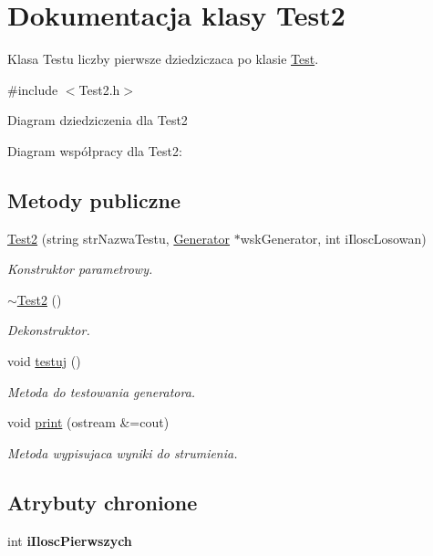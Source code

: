 \hypertarget{classTest2}{\section{Dokumentacja klasy Test2}
\label{classTest2}
}


Klasa Testu liczby pierwsze dziedziczaca po klasie \hyperlink{classTest}{Test}.  




{\ttfamily \#include $<$Test2.\+h$>$}



Diagram dziedziczenia dla Test2


Diagram współpracy dla Test2\+:
\subsection*{Metody publiczne}
\begin{DoxyCompactItemize}
\item 
\hyperlink{classTest2_a86d8e5c85d4c28fdba6f4677915e9bdc}{Test2} (string str\+Nazwa\+Testu, \hyperlink{classGenerator}{Generator} $\ast$wsk\+Generator, int i\+Ilosc\+Losowan)
\begin{DoxyCompactList}\small\item\em Konstruktor parametrowy. \end{DoxyCompactList}\item 
\hypertarget{classTest2_a05e11afd2c55993f40a7ff6bfee08288}{\hyperlink{classTest2_a05e11afd2c55993f40a7ff6bfee08288}{$\sim$\+Test2} ()}\label{classTest2_a05e11afd2c55993f40a7ff6bfee08288}

\begin{DoxyCompactList}\small\item\em Dekonstruktor. \end{DoxyCompactList}\item 
void \hyperlink{classTest2_ae49f0c6f2451d611f417f43717ebd446}{testuj} ()
\begin{DoxyCompactList}\small\item\em Metoda do testowania generatora. \end{DoxyCompactList}\item 
void \hyperlink{classTest2_a084ed28b1f5a8e24abe7319c80292b99}{print} (ostream \&=cout)
\begin{DoxyCompactList}\small\item\em Metoda wypisujaca wyniki do strumienia. \end{DoxyCompactList}\end{DoxyCompactItemize}
\subsection*{Atrybuty chronione}
\begin{DoxyCompactItemize}
\item 
\hypertarget{classTest2_a66235e911dc315f6dc0d00e3285e2fad}{int {\bfseries i\+Ilosc\+Pierwszych}}\label{classTest2_a66235e911dc315f6dc0d00e3285e2fad}

\end{DoxyCompactItemize}


